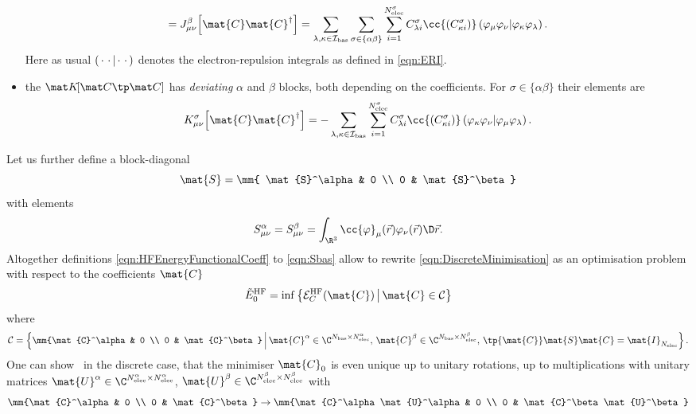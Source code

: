 \begin{rem}
\begin{itemize}
\begin{equation}
					= J_{\mu\nu}^\beta\!\left[\mat{C}\mat{C}^\dagger\right]
					= \sum_{\lambda, \kappa\in\Ibas}
						\sum_{\sigma\in\{\alpha\beta\}}
						\sum_{i=1}^{N_\text{elec}^\sigma}
						C^\sigma_{\lambda i}
						\cc{\left(C^\sigma_{\kappa i}\right)}
						\eriMu{\varphi_{\mu} \varphi_{\nu}}
							{\varphi_{\kappa} \varphi_{\lambda}}.
				\label{eqn:Jbas}
			\end{equation}
			Here as usual $\left( \,\cdot\, \,\cdot\, \middle| \,\cdot\, \,\cdot\, \right)$
			denotes the electron-repulsion integrals as defined in \eqref{eqn:ERI}.
		\item the  $\matKfull$ has
			\emph{deviating} $\alpha$ and $\beta$ blocks,
			both depending on the coefficients.
			For $\sigma \in \{\alpha\beta\}$ their elements are
			\begin{equation}
				K_{\mu\nu}^\sigma\!\left[\mat{C}\mat{C}^\dagger\right]
					= - \sum_{\lambda, \kappa\in\Ibas}
						\sum_{i=1}^{N_\text{elec}^\sigma}
						C^\sigma_{\lambda i}
						\cc{\left(C^\sigma_{\kappa i}\right)}
						\eriMu{\varphi_{\kappa} \varphi_{\nu}}
							{\varphi_{\mu} \varphi_{\lambda}}.
				\label{eqn:Kbas}
			\end{equation}
	\end{itemize}
	Let us further define a block-diagonal 
	\[ \mat{S} = \mm{ \mat{S}^\alpha & 0 \\ 0 & \mat{S}^\beta} \]
	with elements
	\begin{equation}
		S^\alpha_{\mu\nu} = S^\beta_{\mu\nu} = \int_{\R^3} \cc{\varphi}_\mu(\vec{r})
			\varphi_{\nu}(\vec{r})\D\vec{r}.
		\label{eqn:Sbas}
	\end{equation}
	Altogether definitions \eqref{eqn:HFEnergyFunctionalCoeff}
	to \eqref{eqn:Sbas} allow to rewrite \eqref{eqn:DiscreteMinimisation}
	as an optimisation problem with respect to the coefficients $\mat{C}$
	\begin{equation}
		\tilde{E}_0^\text{HF} = \inf \left\{
			\Ehf_C(\mat{C}) \, \middle| \, \mat{C} \in \mathcal{C}
		\right\}
		\label{eqn:HFOptCoeff}
	\end{equation}
	where
	\begin{equation}
		\mathcal{C} = \left\{
			\mm{\mat{C}^\alpha & 0 \\ 0 & \mat{C}^\beta}
			\, \middle| \,
			\mat{C}^\alpha \in \C^{\Nbas\times\NelecA}, \,
			\mat{C}^\beta \in \C^{\Nbas\times\NelecB}, \,
			\tp{\mat{C}} \mat{S} \mat{C} = \mat{I}_{\Nelec}
			\right\}.
		\label{eqn:HFStiefel}
	\end{equation}
	One can show~\cite{Cances2000} in the discrete case,
	that the minimiser $\mat{C}_0$ is even unique
	up to unitary rotations, \ie up to multiplications with unitary matrices
	$\mat{U}^\alpha \in \C^{\NelecA\times\NelecA}$,
	$\mat{U}^\beta \in \C^{\NelecB\times\NelecB}$ with
	\[ \mm{\mat{C}^\alpha & 0 \\ 0 & \mat{C}^\beta}
		\to \mm{\mat{C}^\alpha\mat{U}^\alpha & 0 \\ 0 & \mat{C}^\beta\mat{U}^\beta} \]


\end{rem}

